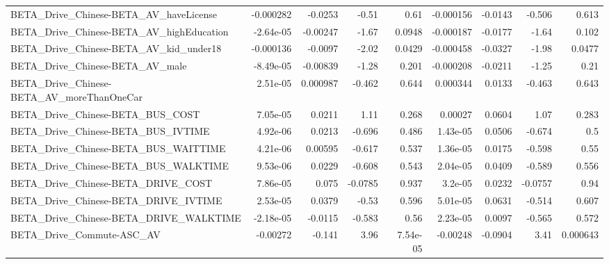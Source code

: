 \begin{tabular}{lrrrrrrrr}
BETA\_Drive\_Chinese-BETA\_AV\_haveLicense             &   -0.000282 &      -0.0253 &    -0.51 &     0.61 &  -0.000156 &     -0.0143 &       -0.506 &         0.613 \\
BETA\_Drive\_Chinese-BETA\_AV\_highEducation           &   -2.64e-05 &     -0.00247 &    -1.67 &   0.0948 &  -0.000187 &     -0.0177 &        -1.64 &         0.102 \\
BETA\_Drive\_Chinese-BETA\_AV\_kid\_under18             &   -0.000136 &      -0.0097 &    -2.02 &   0.0429 &  -0.000458 &     -0.0327 &        -1.98 &        0.0477 \\
BETA\_Drive\_Chinese-BETA\_AV\_male                    &   -8.49e-05 &     -0.00839 &    -1.28 &    0.201 &  -0.000208 &     -0.0211 &        -1.25 &          0.21 \\
BETA\_Drive\_Chinese-BETA\_AV\_moreThanOneCar          &    2.51e-05 &     0.000987 &   -0.462 &    0.644 &   0.000344 &      0.0133 &       -0.463 &         0.643 \\
BETA\_Drive\_Chinese-BETA\_BUS\_COST                   &    7.05e-05 &       0.0211 &     1.11 &    0.268 &    0.00027 &      0.0604 &         1.07 &         0.283 \\
BETA\_Drive\_Chinese-BETA\_BUS\_IVTIME                 &    4.92e-06 &       0.0213 &   -0.696 &    0.486 &   1.43e-05 &      0.0506 &       -0.674 &           0.5 \\
BETA\_Drive\_Chinese-BETA\_BUS\_WAITTIME               &    4.21e-06 &      0.00595 &   -0.617 &    0.537 &   1.36e-05 &      0.0175 &       -0.598 &          0.55 \\
BETA\_Drive\_Chinese-BETA\_BUS\_WALKTIME               &    9.53e-06 &       0.0229 &   -0.608 &    0.543 &   2.04e-05 &      0.0409 &       -0.589 &         0.556 \\
BETA\_Drive\_Chinese-BETA\_DRIVE\_COST                 &    7.86e-05 &        0.075 &  -0.0785 &    0.937 &    3.2e-05 &      0.0232 &      -0.0757 &          0.94 \\
BETA\_Drive\_Chinese-BETA\_DRIVE\_IVTIME               &    2.53e-05 &       0.0379 &    -0.53 &    0.596 &   5.01e-05 &      0.0631 &       -0.514 &         0.607 \\
BETA\_Drive\_Chinese-BETA\_DRIVE\_WALKTIME             &   -2.18e-05 &      -0.0115 &   -0.583 &     0.56 &   2.23e-05 &      0.0097 &       -0.565 &         0.572 \\
BETA\_Drive\_Commute-ASC\_AV                          &    -0.00272 &       -0.141 &     3.96 & 7.54e-05 &   -0.00248 &     -0.0904 &         3.41 &      0.000643 \\

\end{tabular}
